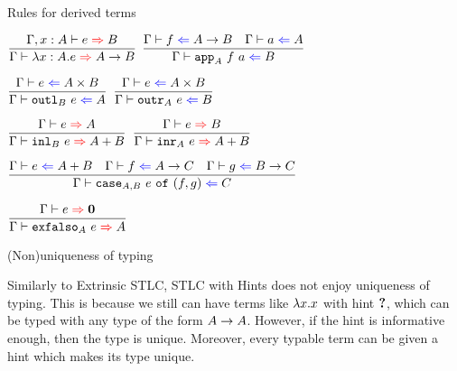 \documentclass{beamer}
\begin{document}
\begin{frame}{Rules for derived terms}

\begin{center}
  $\infrule{\fullinfer{\extend{\Gamma}{x}{A}}{e}{B}}{\infer{\ifun{x}{A}{e}}{\Fun{A}{B}}}$ \quad
  $\infrule{\check{f}{\Fun{A}{B}} \quad \check{a}{A}}{\check{\iapp{A}{f}{a}}{B}}$

  \vspace{2em}

  $\infrule{\check{e}{\Prod{A}{B}}}{\check{\ioutl{B}{e}}{A}}$ \enspace
  $\infrule{\check{e}{\Prod{A}{B}}}{\check{\ioutr{A}{e}}{B}}$

  \vspace{2em}

  $\infrule{\infer{e}{A}}{\infer{\iinl{B}{e}}{\Sum{A}{B}}}$ \quad
  $\infrule{\infer{e}{B}}{\infer{\iinr{A}{e}}{\Sum{A}{B}}}$

  \vspace{2em}

  $\infrule{\check{e}{\Sum{A}{B}} \quad \check{f}{\Fun{A}{C}} \quad \check{g}{\Fun{B}{C}}}{\check{\icase{A}{B}{e}{f}{g}}{C}}$

  \vspace{2em}

  $\infrule{\infer{e}{\Empty}}{\infer{\iexfalso{A}{e}}{A}}$
\end{center}

\end{frame}

\begin{frame}{(Non)uniqueness of typing}

Similarly to Extrinsic STLC, STLC with Hints does not enjoy uniqueness of typing. This is because we still can have terms like $\lambda x. x$ with hint $\textbf{?}$, which can be typed with any type of the form $A \to A$. However, if the hint is informative enough, then the type is unique. Moreover, every typable term can be given a hint which makes its type unique.

\end{frame}
\end{document}

